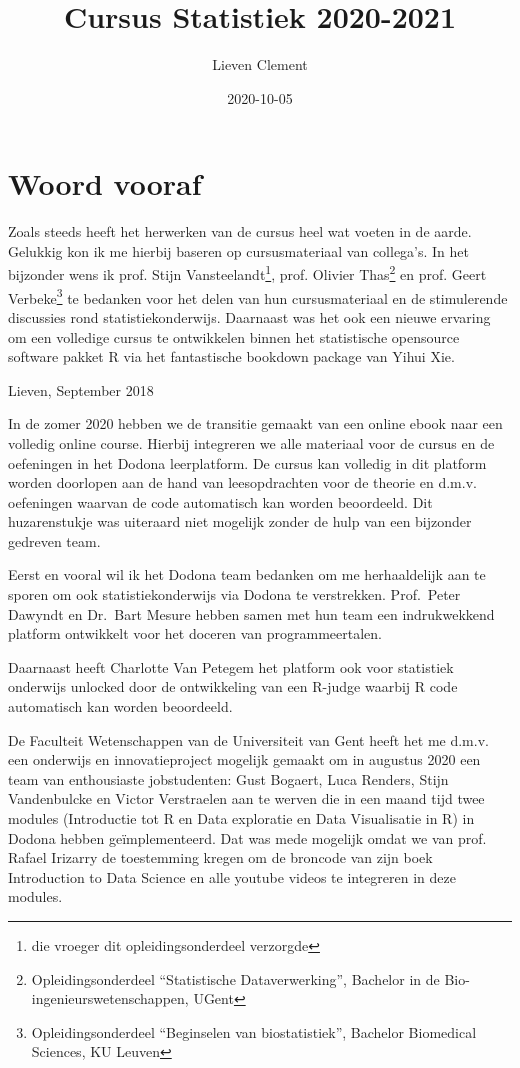 \documentclass[
  12pt,dutch,coursenotes]{book}
\title{Cursus Statistiek 2020-2021}
\author{Lieven Clement}
\date{2020-10-05}
\theoremstyle{definition}
\theoremstyle{definition}
\theoremstyle{definition}
\theoremstyle{remark}
\begin{document}
\maketitle

{
\setcounter{tocdepth}{1}
\tableofcontents
}
\hypertarget{woord-vooraf}{%
\chapter*{Woord vooraf}\label{woord-vooraf}}

Zoals steeds heeft het herwerken van de cursus heel wat voeten in de aarde. Gelukkig kon ik me hierbij baseren op cursusmateriaal van collega's. In het bijzonder wens ik prof. Stijn Vansteelandt\footnote{die vroeger dit opleidingsonderdeel verzorgde}, prof. Olivier Thas\footnote{Opleidingsonderdeel ``Statistische Dataverwerking'', Bachelor in de Bio-ingenieurswetenschappen, UGent} en prof. Geert Verbeke\footnote{Opleidingsonderdeel ``Beginselen van biostatistiek'', Bachelor Biomedical Sciences, KU Leuven} te bedanken voor het delen van hun cursusmateriaal en de stimulerende discussies rond statistiekonderwijs. Daarnaast was het ook een nieuwe ervaring om een volledige cursus te ontwikkelen binnen het statistische opensource software pakket R via het fantastische bookdown package van Yihui Xie.

Lieven, September 2018

In de zomer 2020 hebben we de transitie gemaakt van een online ebook naar een volledig online course.
Hierbij integreren we alle materiaal voor de cursus en de oefeningen in het Dodona leerplatform.
De cursus kan volledig in dit platform worden doorlopen aan de hand van leesopdrachten voor de theorie en d.m.v. oefeningen waarvan de code automatisch kan worden beoordeeld.
Dit huzarenstukje was uiteraard niet mogelijk zonder de hulp van een bijzonder gedreven team.

Eerst en vooral wil ik het Dodona team bedanken om me herhaaldelijk aan te sporen om ook statistiekonderwijs via Dodona te verstrekken. Prof.~Peter Dawyndt en Dr.~Bart Mesure hebben samen met hun team een indrukwekkend platform ontwikkelt voor het doceren van programmeertalen.

Daarnaast heeft Charlotte Van Petegem het platform ook voor statistiek onderwijs unlocked door de ontwikkeling van een R-judge waarbij R code automatisch kan worden beoordeeld.

De Faculteit Wetenschappen van de Universiteit van Gent heeft het me d.m.v. een onderwijs en innovatieproject mogelijk gemaakt om in augustus 2020 een team van enthousiaste jobstudenten: Gust Bogaert, Luca Renders, Stijn Vandenbulcke en Victor Verstraelen aan te werven die in een maand tijd twee modules (Introductie tot R en Data exploratie en Data Visualisatie in R) in Dodona hebben geïmplementeerd. Dat was mede mogelijk omdat we van prof. Rafael Irizarry de toestemming kregen om de broncode van zijn boek Introduction to Data Science en alle youtube videos te integreren in deze modules.
\end{document}
